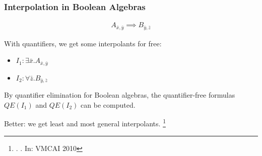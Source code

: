 \documentclass[
    aspectratio=169,
    xcolor={dvipsnames},
]{beamer}
\begin{document}
\begin{frame}
    \frametitle{Interpolation in Boolean Algebras}



    \begin{gather*}
        A_{\bar{x}, \bar{y}} \implies B_{\bar{y}, \bar{z}}
    \end{gather*}

    \pause
    With quantifiers, we get some interpolants for free:

    \begin{itemize}
        \item \(I_1 : \exists \bar{x}. A_{\bar{x}, \bar{y}}\)
        \item \(I_2 : \forall \bar{z}. B_{\bar{y}, \bar{z}}\)
    \end{itemize}


    \pause
    By quantifier elimination for Boolean algebras, the quantifier-free formulas
    \(QE(I_1)\) and \(QE(I_2)\) can be computed. 

    \pause
    Better: we get least and most general interpolants. \footnote{. \emph{}. In: VMCAI 2010}
\end{frame}


\end{document}
